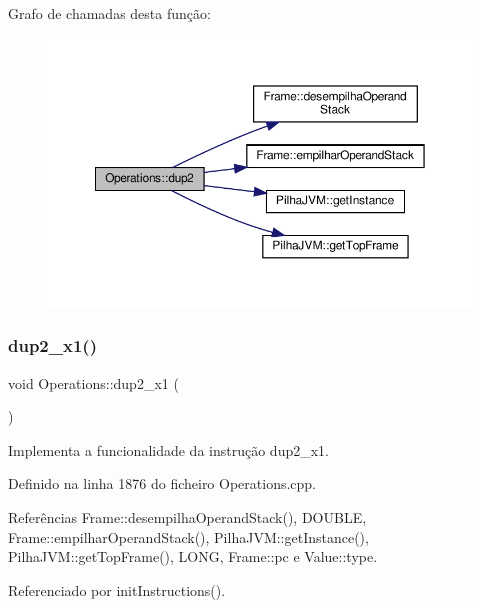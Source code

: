 Grafo de chamadas desta função\+:
\nopagebreak
\begin{figure}[H]
\begin{center}
\leavevmode
\includegraphics[width=350pt]{classOperations_a7cb6985281b1ab32e905e4726ef2c964_cgraph}
\end{center}
\end{figure}
\mbox{\label{classOperations_a57b0cf4d7a133bf35b39fcf8d6e15511}} 
\subsubsection{\texorpdfstring{dup2\+\_\+x1()}{dup2\_x1()}}
{\footnotesize\ttfamily void Operations\+::dup2\+\_\+x1 (\begin{DoxyParamCaption}{ }\end{DoxyParamCaption})\hspace{0.3cm}{\ttfamily [private]}}



Implementa a funcionalidade da instrução dup2\+\_\+x1. 



Definido na linha 1876 do ficheiro Operations.\+cpp.



Referências Frame\+::desempilha\+Operand\+Stack(), D\+O\+U\+B\+LE, Frame\+::empilhar\+Operand\+Stack(), Pilha\+J\+V\+M\+::get\+Instance(), Pilha\+J\+V\+M\+::get\+Top\+Frame(), L\+O\+NG, Frame\+::pc e Value\+::type.



Referenciado por init\+Instructions().

